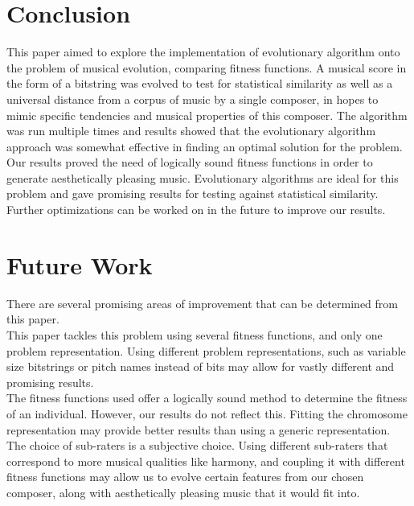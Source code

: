 \documentclass[conference]{IEEEtran}
\begin{document}
\section{Conclusion}
This paper aimed to explore the implementation of evolutionary algorithm onto the problem of musical evolution, comparing fitness functions. A musical score in the form of a bitstring was evolved to test for statistical similarity as well as a universal distance from a corpus of music by a single composer, in hopes to mimic specific tendencies and musical properties of this composer. The algorithm was run multiple times and results showed that the evolutionary algorithm
approach was somewhat effective in finding an optimal solution for the
problem. Our results proved the need of logically sound fitness functions in order to generate aesthetically pleasing music. Evolutionary algorithms are ideal for this problem and gave promising results for testing against statistical similarity. Further optimizations can be worked on in the future to improve our results.

\section{Future Work}
There are several promising areas of improvement that can be determined from this paper. \\
This paper tackles this problem using several fitness functions, and only one problem representation. Using different problem representations, such as variable size bitstrings or pitch names instead of bits may allow for vastly different and promising results.\\
The fitness functions used offer a logically sound method to determine the fitness of an individual. However, our results do not reflect this. Fitting the chromosome representation may provide better results than using a generic representation. \\
The choice of sub-raters is a subjective choice. Using different sub-raters that correspond to more musical qualities like harmony, and coupling it with different fitness functions may allow us to evolve certain features from our chosen composer, along with aesthetically pleasing music that it would fit into. 
\end{document}

